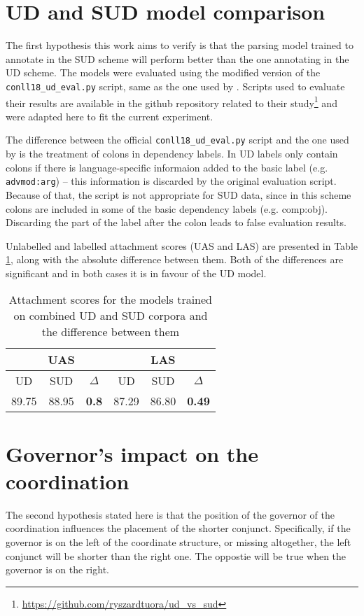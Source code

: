 \section{UD and SUD model comparison}
The first hypothesis this work aims to verify is that the parsing model trained to annotate in the SUD scheme will perform better than the one annotating in the UD scheme. The models were evaluated using the modified version of the \texttt{conll18\_ud\_eval.py} script, same as the one used by \cite{tuo:prz:lac:21}. Scripts used to evaluate their results are available in the github repository related to their study\footnote{\url{https://github.com/ryszardtuora/ud_vs_sud}} and were adapted here to fit the current experiment. 

The difference between the official \texttt{conll18\_ud\_eval.py} script and the one used by \cite{tuo:prz:lac:21} is the treatment of colons in dependency labels. In UD labels only contain colons if there is language-specific informaion added to the basic label (e.g. \texttt{advmod:arg}) -- this information is discarded by the original evaluation script. Because of that, the script is not appropriate for SUD data, since in this scheme colons are included in some of the basic dependency labels (e.g. comp:obj). Discarding the part of the label after the colon leads to false evaluation results. 

Unlabelled and labelled attachment scores (UAS and LAS) are presented in Table \ref{tab:mcnemar}, along with the absolute difference between them. Both of the differences are significant and in both cases it is in favour of the UD model. 

\begin{table}[h!]
\centering
\begin{tabular}{|| c c c | c c c ||}
\hline
& UAS & & & LAS & \\
\hline
UD & SUD & $\Delta$ & UD & SUD & $\Delta$ \\
\hline \hline
89.75 & 88.95 & \textbf{0.8} & 87.29 & 86.80 & \textbf{0.49} \\
\hline
\end{tabular}
\caption{Attachment scores for the models trained on combined UD and SUD corpora and the difference between them}
\label{tab:mcnemar}
\end{table}

\section{Governor's impact on the coordination}
The second hypothesis stated here is that the position of the governor of the coordination influences the placement of the shorter conjunct. Specifically, if the governor is on the left of the coordinate structure, or missing altogether, the left conjunct will be shorter than the right one. The oppostie will be true when the governor is on the right. 